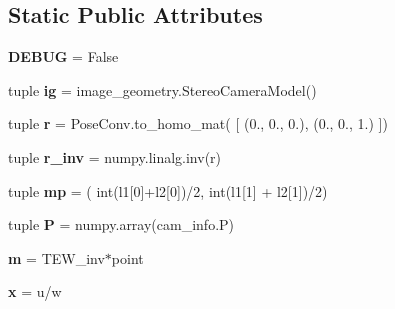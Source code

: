 \subsection*{Static Public Attributes}
\begin{DoxyCompactItemize}
\item 
\hypertarget{classautocamera__algorithm_1_1Autocamera_a8f958fa5bb7600d9d300e367c907d8eb}{{\bfseries D\-E\-B\-U\-G} = False}\label{classautocamera__algorithm_1_1Autocamera_a8f958fa5bb7600d9d300e367c907d8eb}

\item 
\hypertarget{classautocamera__algorithm_1_1Autocamera_a61c1aff3f5d33b45e334d7f689845bd2}{tuple {\bfseries ig} = image\-\_\-geometry.\-Stereo\-Camera\-Model()}\label{classautocamera__algorithm_1_1Autocamera_a61c1aff3f5d33b45e334d7f689845bd2}

\item 
\hypertarget{classautocamera__algorithm_1_1Autocamera_a4cf82103ade000d5fab46b0967faa93b}{tuple {\bfseries r} = Pose\-Conv.\-to\-\_\-homo\-\_\-mat( \mbox{[} (0., 0., 0.), (0., 0., 1.) \mbox{]})}\label{classautocamera__algorithm_1_1Autocamera_a4cf82103ade000d5fab46b0967faa93b}

\item 
\hypertarget{classautocamera__algorithm_1_1Autocamera_a95913023e8d85880d30bbca76e0044db}{tuple {\bfseries r\-\_\-inv} = numpy.\-linalg.\-inv(r)}\label{classautocamera__algorithm_1_1Autocamera_a95913023e8d85880d30bbca76e0044db}

\item 
\hypertarget{classautocamera__algorithm_1_1Autocamera_a37bf464128bbbefe8d3f83e65bcb51ad}{tuple {\bfseries mp} = ( int(l1\mbox{[}0\mbox{]}+l2\mbox{[}0\mbox{]})/2, int(l1\mbox{[}1\mbox{]} + l2\mbox{[}1\mbox{]})/2)}\label{classautocamera__algorithm_1_1Autocamera_a37bf464128bbbefe8d3f83e65bcb51ad}

\item 
\hypertarget{classautocamera__algorithm_1_1Autocamera_ab9597b120e0539e35ab615a260fc98df}{tuple {\bfseries P} = numpy.\-array(cam\-\_\-info.\-P)}\label{classautocamera__algorithm_1_1Autocamera_ab9597b120e0539e35ab615a260fc98df}

\item 
\hypertarget{classautocamera__algorithm_1_1Autocamera_a7b3083c9cc2b78e45f270ef16b66c82e}{{\bfseries m} = T\-E\-W\-\_\-inv$\ast$point}\label{classautocamera__algorithm_1_1Autocamera_a7b3083c9cc2b78e45f270ef16b66c82e}

\item 
\hypertarget{classautocamera__algorithm_1_1Autocamera_a9e6aec10c509b20ba0bf5df8e06c4a04}{{\bfseries x} = u/w}\label{classautocamera__algorithm_1_1Autocamera_a9e6aec10c509b20ba0bf5df8e06c4a04}


\end{DoxyCompactItemize}
